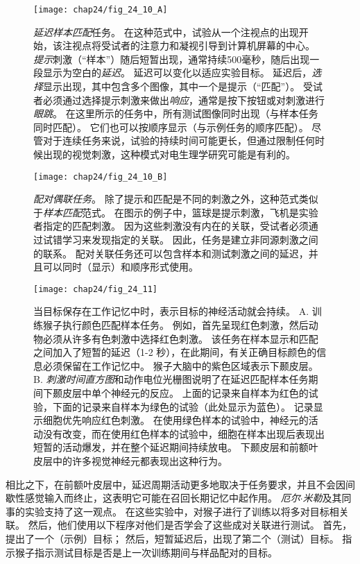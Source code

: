 \begin{figure}[htbp]
	\centering
	\texttt{[image: chap24/fig\_24\_10\_A]}
	\caption{\textit{延迟样本匹配}任务。
		在这种范式中，试验从一个注视点的出现开始，该注视点将受试者的注意力和凝视引导到计算机屏幕的中心。
		\textit{提示}刺激（“样本”）随后短暂出现，通常持续500毫秒，随后出现一段显示为空白的\textit{延迟}。
		延迟可以变化以适应实验目标。
		延迟后，\textit{选择}显示出现，其中包含多个图像，其中一个是提示（“匹配”）。
		受试者必须通过选择提示刺激来做出\textit{响应}，通常是按下按钮或对刺激进行\textit{眼跳}。
		在这里所示的任务中，所有测试图像同时出现（与样本任务同时匹配）。
		它们也可以按顺序显示（与示例任务的顺序匹配）。
		尽管对于连续任务来说，试验的持续时间可能更长，但通过限制任何时候出现的视觉刺激，这种模式对电生理学研究可能是有利的。}
	\label{fig:24_10_a}
\end{figure}


\begin{figure}[htbp]
	\centering
	\texttt{[image: chap24/fig\_24\_10\_B]}
	\caption{\textit{配对偶联任务}。
		除了提示和匹配是不同的刺激之外，这种范式类似于\textit{样本匹配}范式。
		在图示的例子中，篮球是提示刺激，飞机是实验者指定的匹配刺激。
		因为这些刺激没有内在的关联，受试者必须通过试错学习来发现指定的关联。
		因此，任务是建立非同源刺激之间的联系。
		配对关联任务还可以包含样本和测试刺激之间的延迟，并且可以同时（显示）和顺序形式使用。}
	\label{fig:24_10_b}
\end{figure}


\begin{figure}[htbp]
	\centering
	\texttt{[image: chap24/fig\_24\_11]}
	\caption{当目标保存在工作记忆中时，表示目标的神经活动就会持续。 
		A. 训练猴子执行颜色匹配样本任务。
		例如，首先呈现红色刺激，然后动物必须从许多有色刺激中选择红色刺激。
		该任务在样本显示和匹配之间加入了短暂的延迟（1-2 秒），在此期间，有关正确目标颜色的信息必须保留在工作记忆中。
		猴子大脑中的紫色区域表示下颞皮层。
		B. \textit{刺激时间直方图}和动作电位光栅图说明了在延迟匹配样本任务期间下颞皮层中单个神经元的反应。
		上面的记录来自样本为红色的试验，下面的记录来自样本为绿色的试验（此处显示为蓝色）。
		记录显示细胞优先响应红色刺激。
		在使用绿色样本的试验中，神经元的活动没有改变，而在使用红色样本的试验中，细胞在样本出现后表现出短暂的活动爆发，并在整个延迟期间持续放电。
		下颞皮层和前额叶皮层中的许多视觉神经元都表现出这种行为。}
	\label{fig:24_11}
\end{figure}


相比之下，在前额叶皮层中，延迟周期活动更多地取决于任务要求，并且不会因间歇性感觉输入而终止，这表明它可能在召回长期记忆中起作用。
\textit{厄尔$\cdot$米勒}及其同事的实验支持了这一观点。
在这些实验中，对猴子进行了训练以将多对目标相关联。
然后，他们使用以下程序对他们是否学会了这些成对关联进行测试。
首先，提出了一个（示例）目标； 然后，短暂延迟后，出现了第二个（测试）目标。
指示猴子指示测试目标是否是上一次训练期间与样品配对的目标。


